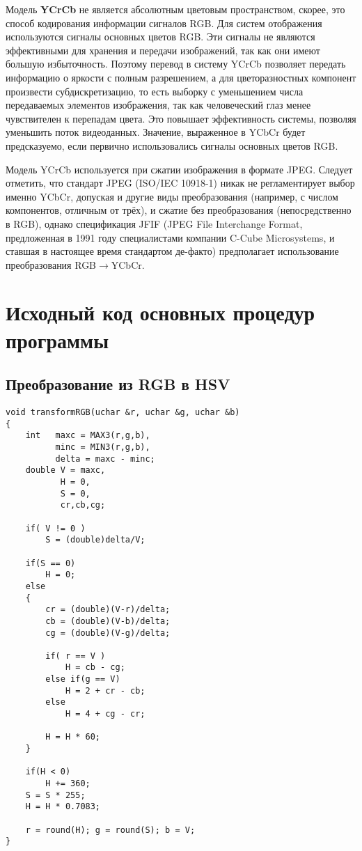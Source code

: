 Модель \textbf{YCrCb} не является абсолютным цветовым пространством, скорее, это способ кодирования информации сигналов RGB. Для систем отображения используются сигналы основных цветов RGB. Эти сигналы не являются эффективными для хранения и передачи изображений, так как они имеют большую избыточность. Поэтому перевод в систему YCrCb позволяет передать информацию о яркости с полным разрешением, а для цветоразностных компонент произвести субдискретизацию, то есть выборку с уменьшением числа передаваемых элементов изображения, так как человеческий глаз менее чувствителен к перепадам цвета. Это повышает эффективность системы, позволяя уменьшить поток видеоданных. Значение, выраженное в YCbCr будет предсказуемо, если первично использовались сигналы основных цветов RGB.

Модель YCrCb используется при сжатии изображения в формате JPEG. Следует отметить, что стандарт JPEG (ISO/IEC 10918-1) никак не регламентирует выбор именно YCbCr, допуская и другие виды преобразования (например, с числом компонентов, отличным от трёх), и сжатие без преобразования (непосредственно в RGB), однако спецификация JFIF (JPEG File Interchange Format, предложенная в 1991 году специалистами компании C-Cube Microsystems, и ставшая в настоящее время стандартом де-факто) предполагает использование преобразования RGB$\rightarrow$YCbCr.

\newpage
\section{Исходный код основных процедур программы}
\subsection{Преобразование из RGB в HSV}
\begin{lstlisting}
void transformRGB(uchar &r, uchar &g, uchar &b)
{
    int   maxc = MAX3(r,g,b),
          minc = MIN3(r,g,b),
          delta = maxc - minc;
    double V = maxc,
           H = 0,
           S = 0,
           cr,cb,cg;

    if( V != 0 )
        S = (double)delta/V;

    if(S == 0)
        H = 0;
    else
    {
        cr = (double)(V-r)/delta;
        cb = (double)(V-b)/delta;
        cg = (double)(V-g)/delta;

        if( r == V )
            H = cb - cg;
        else if(g == V)
            H = 2 + cr - cb;
        else
            H = 4 + cg - cr;

        H = H * 60;
    }

    if(H < 0)
        H += 360;
    S = S * 255;
    H = H * 0.7083;

    r = round(H); g = round(S); b = V;
}
\end{lstlisting}

